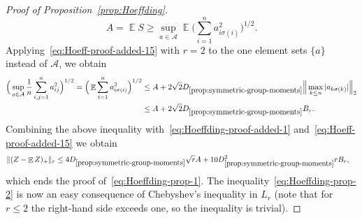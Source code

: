 \documentclass[a4paper]{amsart}
\theoremstyle{definition}
\theoremstyle{remark}
\numberwithin{equation}{section}
\newcommand*{\ds}{D_{\ref{prop:symmetric-group-moments}}}
\DeclareMathOperator{\EE}{\mathbb{E}} %
\begin{document}
\begin{proof}[Proof of Proposition~\ref{prop:Hoeffding}]
\begin{displaymath}
A = \EE S \ge \sup_{a\in \mathcal{A}}\EE \Big(\sum_{i=1}^n a_{i\sigma(i)}^2\Big)^{1/2}.
\end{displaymath}
Applying~\eqref{eq:Hoeff-proof-added-15} with $r=2$ to the one element sets $\{a\}$ instead of $\mathcal{A}$, we obtain
\begin{align}
   \Big( \sup_{a\in \mathcal{A}} \frac{1}{n}\sum_{i,j=1}^n a_{ij}^2\Big)^{1/2} = \Big(\EE \sum_{i=1}^n a_{i\sigma(i)}^2\Big)^{1/2}
  &\le A + 2\sqrt{2}\ds \Big\|\max_{k\le n}|a_{k\sigma(k)}|\Big\|_2 \nonumber \\
  & \le A + 2\sqrt{2}\ds B_r.\nonumber
\end{align}
Combining the above inequality with~\eqref{eq:Hoeffding-proof-added-1} and~\eqref{eq:Hoeff-proof-added-15} we obtain
\begin{align*}%
  \|(Z-\EE Z)_+\|_r  %
  & \le 4\ds\sqrt{r}A  + 10\ds^2rB_r,
\end{align*}
which ends the proof of~\eqref{eq:Hoeffding-prop-1}. The inequality~\eqref{eq:Hoeffding-prop-2} is now an easy consequence of Chebyshev's inequality in $L_r$ (note that for $r \le 2$ the right-hand side exceeds one, so the inequality is trivial).
\end{proof}
\end{document}
